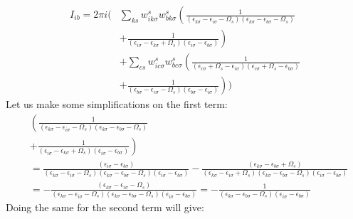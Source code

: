 \documentclass[12pt]{article}
\begin{document}
\begin{equation}
\begin{aligned}
I_{ib} = 2\pi i \Bigg( & \sum_{ks} w_{i k \sigma}^s w_{b k \sigma}^s \left( \frac{1}{(\epsilon_{k \sigma} -\epsilon_{i \sigma}-\Omega_s)(\epsilon_{k \sigma} -\epsilon_{b \sigma}-\Omega_s)} \right. \\
& \left. + \frac{1}{(\epsilon_{i \sigma} -\epsilon_{k \sigma}+\Omega_s)(\epsilon_{i \sigma} -\epsilon_{b \sigma})} \right) \\
& + \sum_{cs} w_{i c \sigma}^s w_{b c \sigma}^s \left( \frac{1}{(\epsilon_{c \sigma} + \Omega_s -\epsilon_{i \sigma})(\epsilon_{c \sigma} + \Omega_s -\epsilon_{b \sigma})} \right. \\
& \left. + \frac{1}{(\epsilon_{b \sigma} -\epsilon_{c \sigma}-\Omega_s)(\epsilon_{b \sigma} -\epsilon_{i \sigma})} \right) \Bigg)
\end{aligned}
\end{equation}
Let us make some simplifications on the first term:
\begin{equation}
\begin{aligned}
& \left( \frac{1}{(\epsilon_{k \sigma} -\epsilon_{i \sigma}-\Omega_s)(\epsilon_{k \sigma} -\epsilon_{b \sigma}-\Omega_s)} \right. \\
& \left. + \frac{1}{(\epsilon_{i \sigma} -\epsilon_{k \sigma}+\Omega_s)(\epsilon_{i \sigma} -\epsilon_{b \sigma})} \right) \\
& = \frac{\left( \epsilon_{i\sigma } - \epsilon_{b\sigma } \right)}{\left(\epsilon_{k\sigma } - \epsilon_{i\sigma } - \Omega _s\right)\left(\epsilon_{k\sigma } - \epsilon_{b\sigma } - \Omega _s\right)\left(\epsilon_{i\sigma } - \epsilon_{b\sigma }\right)} - \frac{\left(\epsilon _{k\sigma } - \epsilon _{b\sigma} + \Omega _s \right)}{\left(\epsilon _{k\sigma } - \epsilon _{i\sigma} + \Omega _s\right)\left(\epsilon _{k\sigma } - \epsilon _{b\sigma} - \Omega _s\right)\left(\epsilon _{i\sigma } - \epsilon _{b\sigma}\right)}\\
& = - \frac{\left( \epsilon_{k\sigma } - \epsilon_{i\sigma } - \Omega _s \right)}{\left(\epsilon_{k\sigma } - \epsilon_{i\sigma } - \Omega _s\right)\left(\epsilon_{k\sigma } - \epsilon_{b\sigma } - \Omega _s\right)\left(\epsilon_{i\sigma } - \epsilon_{b\sigma }\right)} = -\frac{1}{\left(\epsilon_{k\sigma } - \epsilon_{b\sigma } - \Omega _s\right)\left(\epsilon_{i \sigma } - \epsilon_{b \sigma }\right)}
\end{aligned}
\end{equation}
Doing the same for the second term will give:
\end{document}
